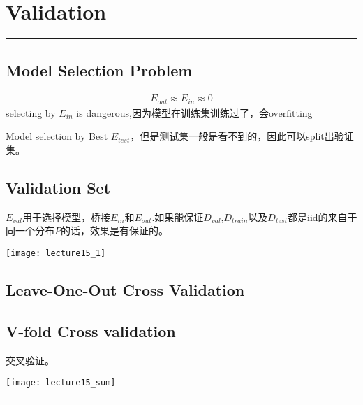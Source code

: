\section{Validation}
\noindent
{\color{LightRubineRed} \rule{\linewidth}{1mm} }
\subsection{Model Selection Problem} %
\label{sub:model_selection_problem}
\begin{align*}
E_{out} \approx E_{in} \approx 0
\end{align*}
selecting by $E_{in}$ is dangerous,因为模型在训练集训练过了，会overfitting \par
Model selection by Best $E_{test}$，但是测试集一般是看不到的，因此可以split出验证集。\par

\subsection{Validation Set} %
\label{sub:validation_set}
$E_{val}$用于选择模型，桥接$E_{in}$和$E_{out}$.如果能保证$D_{val}$,$D_{train}$以及$D_{test}$都是iid的来自于同一个分布$P$的话，效果是有保证的。 \par
\begin{center}
\texttt{[image: lecture15\_1]}
\end{center}

\subsection{Leave-One-Out Cross Validation} %
\label{sub:leave_one_out_cross_validation}

\subsection{V-fold Cross validation} %
\label{sub:v_fold_cross_validation}
交叉验证。
\begin{center}
\texttt{[image: lecture15\_sum]}
\end{center}
\noindent
{\color{RubineRed} \rule{\linewidth}{1mm} }